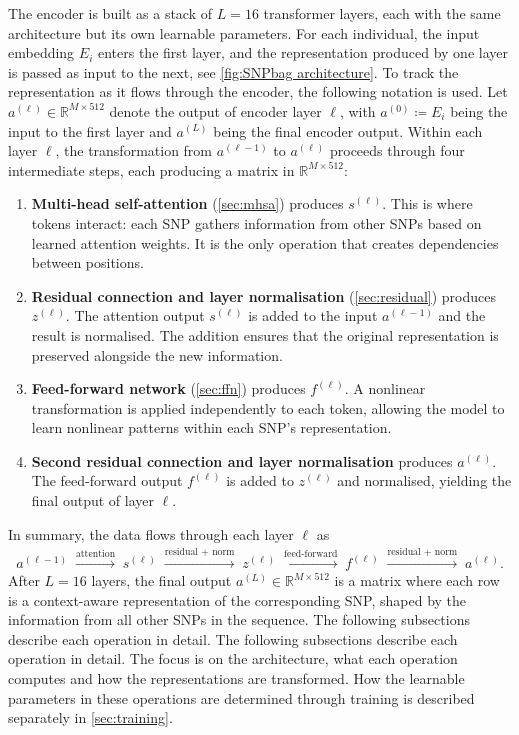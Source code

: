 The encoder is built as a stack of $L = 16$ transformer layers, each with the same architecture but its own learnable parameters. For each individual, the input embedding $E_i$ enters the first layer, and the representation produced by one layer is passed as input to the next, see \autoref{fig:SNPbag architecture}. To track the representation as it flows through the encoder, the following notation is used. Let $a^{(\ell)} \in \mathbb{R}^{M \times 512}$ denote the output of encoder layer $\ell$, with $a^{(0)} \coloneqq E_i$ being the input to the first layer and $a^{(L)}$ being the final encoder output. Within each layer $\ell$, the transformation from $a^{(\ell-1)}$ to $a^{(\ell)}$ proceeds through four intermediate steps, each producing a matrix in $\mathbb{R}^{M \times 512}$:
\begin{enumerate}
    \item \textbf{Multi-head self-attention} (\autoref{sec:mhsa}) produces $s^{(\ell)}$. This is where tokens interact: each SNP gathers information from other SNPs based on learned attention weights. It is the only operation that creates dependencies between positions.
    \item \textbf{Residual connection and layer normalisation} (\autoref{sec:residual}) produces $z^{(\ell)}$. The attention output $s^{(\ell)}$ is added to the input $a^{(\ell-1)}$ and the result is normalised. The addition ensures that the original representation is preserved alongside the new information.
    \item \textbf{Feed-forward network} (\autoref{sec:ffn}) produces $f^{(\ell)}$. A nonlinear transformation is applied independently to each token, allowing the model to learn nonlinear patterns within each SNP's representation.
    \item \textbf{Second residual connection and layer normalisation} produces $a^{(\ell)}$. The feed-forward output $f^{(\ell)}$ is added to $z^{(\ell)}$ and normalised, yielding the final output of layer $\ell$.
\end{enumerate}
In summary, the data flows through each layer $\ell$ as
\begin{align*}
    a^{(\ell-1)} \;\xrightarrow{\text{attention}}\; s^{(\ell)} \;\xrightarrow{\text{residual + norm}}\; z^{(\ell)} \;\xrightarrow{\text{feed-forward}}\; f^{(\ell)} \;\xrightarrow{\text{residual + norm}}\; a^{(\ell)}.
\end{align*}
After $L = 16$ layers, the final output $a^{(L)} \in \mathbb{R}^{M \times 512}$ is a matrix where each row is a context-aware representation of the corresponding SNP, shaped by the information from all other SNPs in the sequence. The following subsections describe each operation in detail. The following subsections describe each operation in detail. The focus
is on the architecture, what each operation computes and how the
representations are transformed. How the learnable parameters in these
operations are determined through training is described separately in
\autoref{sec:training}.

